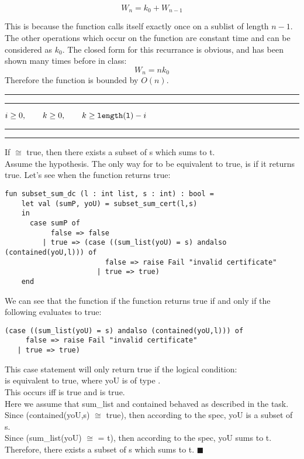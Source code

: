 \documentclass[11pt,letterpaper]{article}
\newcommand{\question}[2] {\vspace{.25in} \hrule\vspace{0.5em}
\noindent{\bf #1: #2} \vspace{0.5em}
\hrule \vspace{.10in}}
\begin{document}
$$W_n= k_0 + W_{n-1}$$

This is because the function calls itself exactly once on a sublist of length $n-1$. The other operations which occur on the function are constant time and can be considered as $k_0$. The closed form for this recurrance is obvious, and has been shown many times before in class: 
$$W_n= n k_0$$
Therefore the function is bounded by $O(n)$.


\question{5}{Task 5.1}
$i \geq 0, \qquad k\geq 0, \qquad k\geq \mathtt{length(l)} -i $

\question{6}{Task 6.4}
If  $\cong$ true, then there exists a subset of s which sums to t.\\
Assume the hypothesis. The only way for  to be equivalent to true, is if it returns true. Let's see when the function returns true:
\begin{verbatim}
fun subset_sum_dc (l : int list, s : int) : bool =
    let val (sumP, yoU) = subset_sum_cert(l,s)
    in
      case sumP of
           false => false
         | true => (case ((sum_list(yoU) = s) andalso (contained(yoU,l))) of
                        false => raise Fail "invalid certificate"
                      | true => true)
    end
\end{verbatim}

We can see that the function if the function returns true if and only if the following evaluates to true:
\begin{verbatim}
(case ((sum_list(yoU) = s) andalso (contained(yoU,l))) of
     false => raise Fail "invalid certificate"
   | true => true)
\end{verbatim}
This case statement will only return true if the logical condition:\\
  is equivalent to true, where yoU is of type  .\\
This occurs iff  is true and  is true.\\
Here we assume that sum\_list and contained behaved as described in the task.\\
Since (contained(yoU,s) $\cong$ true), then according to the spec, yoU is a subset of s.\\
Since (sum\_list(yoU) $\cong$ = t), then according to the spec, yoU sums to t.\\
Therefore, there exists a subset of s which sums to t. $\blacksquare$
\end{document}
